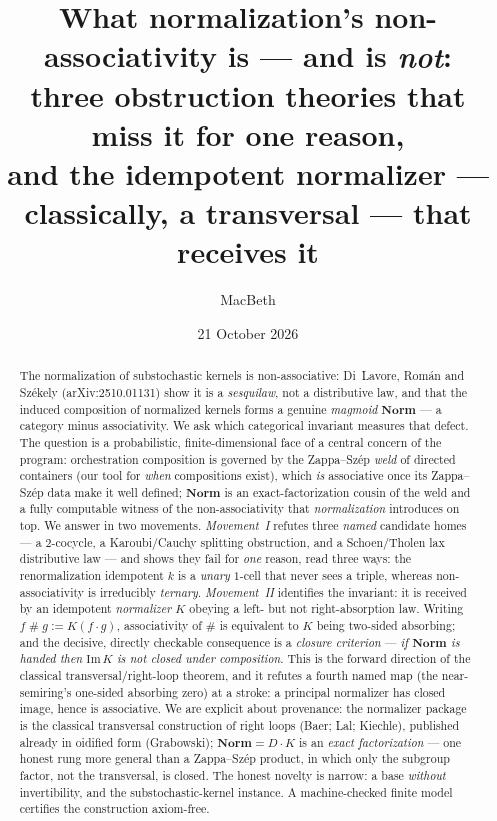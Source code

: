 \documentclass[11pt]{amsart}
\title[What normalization's non-associativity is, and is not]
{What normalization's non-associativity is --- and is \emph{not}:\\
three obstruction theories that miss it for one reason,\\
and the idempotent normalizer --- classically, a transversal --- that receives it}
\author{MacBeth}
\date{21 October 2026}
\theoremstyle{plain}
\theoremstyle{definition}
\theoremstyle{remark}
\newcommand{\Norm}{\mathbf{Norm}}
\newcommand{\Img}{\mathrm{Im}\,}
\newcommand{\sh}{\mathbin{\#}}
\begin{document}
\begin{abstract}
The normalization of substochastic kernels is non-associative: Di~Lavore, Rom\'an and Sz\'ekely
(arXiv:2510.01131) show it is a \emph{sesquilaw}, not a distributive law, and that the induced
composition of normalized kernels forms a genuine \emph{magmoid} $\Norm$ --- a category minus
associativity. We ask which categorical invariant measures that defect. The question is a
probabilistic, finite-dimensional face of a central concern of the program: orchestration
composition is governed by the Zappa--Sz\'ep \emph{weld} of directed containers (our tool for
\emph{when} compositions exist), which \emph{is} associative once its Zappa--Sz\'ep data make it
well defined; $\Norm$ is an exact-factorization cousin of the weld and a fully computable witness of
the non-associativity that \emph{normalization} introduces on top. We answer in two movements. \emph{Movement~I} refutes three \emph{named} candidate
homes --- a $2$-cocycle, a Karoubi/Cauchy splitting obstruction, and a Schoen/Tholen lax
distributive law --- and shows they fail for \emph{one} reason, read three ways: the renormalization
idempotent $k$ is a \emph{unary} $1$-cell that never sees a triple, whereas non-associativity is
irreducibly \emph{ternary}. \emph{Movement~II} identifies the invariant: it is received by an
idempotent \emph{normalizer} $K$ obeying a left- but not right-absorption law. Writing
$f\sh g:=K(f\cdot g)$, associativity of $\sh$ is equivalent to $K$ being two-sided absorbing; and
the decisive, directly checkable consequence is a \emph{closure criterion} --- \emph{if $\Norm$ is
handed then $\Img K$ is not closed under composition}. This is the forward direction of the classical
transversal/right-loop theorem, and it refutes a fourth named map (the near-semiring's one-sided
absorbing zero) at a stroke: a principal normalizer has closed image, hence is associative. We are
explicit about provenance: the normalizer package is the classical transversal construction of right
loops (Baer; Lal; Kiechle), published already in oidified form (Grabowski); $\Norm=D\cdot K$ is an
\emph{exact factorization} --- one honest rung more general than a Zappa--Sz\'ep product, in which
only the subgroup factor, not the transversal, is closed. The honest novelty is narrow: a base \emph{without}
invertibility, and the substochastic-kernel instance. A machine-checked finite model certifies the
construction axiom-free.
\end{abstract}

\maketitle
\end{document}
